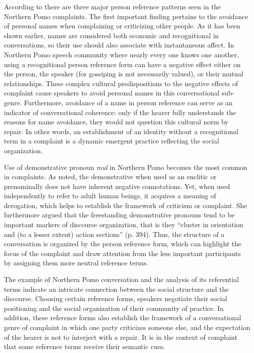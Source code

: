 \documentclass[12pt]{article}
\begin{document}
According to \textcite{oconnor1990} there are three major person reference patterns seen in the Northern Pomo complaints. The first important finding pertains to the avoidance of personal names when complaining or criticizing other people. As it has been shown earlier, names are considered both economic and recognitional in conversations, so their use should also associate with instantaneous affect. In Northern Pomo speech community where nearly every one knows one another, using a recognitional person reference form can have a negative effect either on the person, the speaker (for gossiping is not necessarily valued), or their mutual relationships. These complex cultural predispositions to the negative effects of complaint cause speakers to avoid personal names in this conversational sub-genre. Furthermore, avoidance of a name in person reference can serve as an indicator of conversational coherence: only if the hearer fully understands the reasons for name avoidance, they would not question this cultural norm by repair. In other words, an establishment of an identity without a recognitional term in a complaint is a dynamic emergent practice reflecting the social organization.

Use of demonstrative pronoun \textit{mul} in Northern Pomo becomes the most common in complaints. As \textcite{oconnor1990} noted, the demonstrative when used as an enclitic or prenominally does not have inherent negative connotations. Yet, when used independently to refer to adult human beings, it acquires a meaning of derogation, which helps to establish the framework of criticism or complaint. She furthermore argued that the freestanding demonstrative pronouns tend to be important markers of discourse organization, that is they ``cluster in orientation and (to a lesser extent) action sections'' (p. 394). Thus, the structure of a conversation is organized by the person reference form, which can highlight the focus of the complaint and draw attention from the less important participants by assigning them more neutral reference terms. 

The example of Northern Pomo conversation and the analysis of its referential terms indicate an intricate connection between the social structure and the discourse. Choosing certain reference forms, speakers negotiate their social positioning and the social organization of their community of practice. In addition, these reference forms also establish the framework of a conversational genre of complaint in which one party criticizes someone else, and the expectation of the hearer is not to interject with a repair. It is in the context of complaint that some reference terms receive their semantic cues. 
\end{document}
